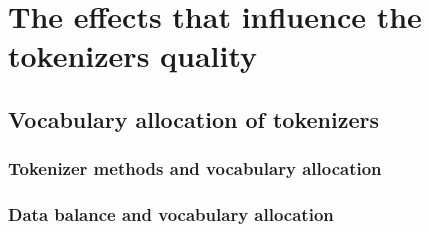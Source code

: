 
\section{The effects that influence the tokenizers quality}


\subsection{Vocabulary allocation of tokenizers}
\subsubsection{Tokenizer methods and vocabulary allocation}



\subsubsection{Data balance and vocabulary allocation}

